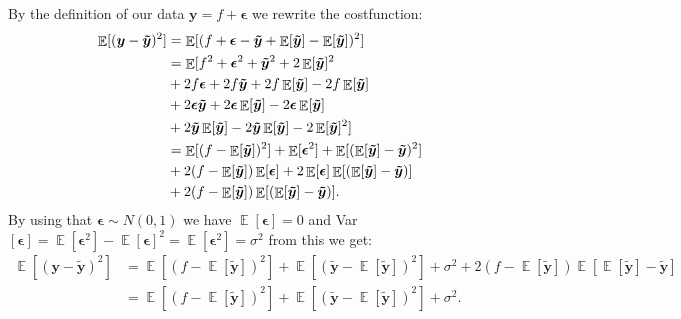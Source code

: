 \documentclass[11pt]{article}
\DeclareMathOperator*{\E}{\mathbb{E}}
\begin{document}
By the definition of our data $\boldsymbol{y} = f +\boldsymbol{\epsilon}$ we rewrite the costfunction:
\begin{align*}
    \E[(\boldsymbol{y}- \boldsymbol{\tilde{y}})^2] & = \E[(f + \boldsymbol{\epsilon} - \boldsymbol{\tilde{y}} + \E[\boldsymbol{\tilde{y}}]- \E[\boldsymbol{\tilde{y}}])^2]                                  \\                                             &= \E[f^2 + \boldsymbol{\epsilon}^2 + \boldsymbol{\tilde{y}}^2 + 2\E[\boldsymbol{\tilde{y}}]^2 \\
                                                   & + 2f\boldsymbol{\epsilon} + 2f\boldsymbol{\tilde{y}} + 2f\E[\boldsymbol{\tilde{y}}] - 2f\E[\boldsymbol{\tilde{y}}]                                     \\
                                                   & + 2\boldsymbol{\epsilon}\boldsymbol{\tilde{y}} + 2\boldsymbol{\epsilon} \E[\boldsymbol{\tilde{y}}] - 2\boldsymbol{\epsilon} \E[\boldsymbol{\tilde{y}}] \\
                                                   & + 2\boldsymbol{\tilde{y}}\E[\boldsymbol{\tilde{y}}] - 2\boldsymbol{\tilde{y}}\E[\boldsymbol{\tilde{y}}] -2\E[\boldsymbol{\tilde{y}}]^2]                \\
                                                   & = \E[(f-\E[\boldsymbol{\Tilde{y}}])^2] + \E[\boldsymbol{\epsilon}^2] + \E[( \E[\boldsymbol{\Tilde{y}}] - \boldsymbol{\Tilde{y}} )^2]                   \\
                                                   & + 2(f-\E[\boldsymbol{\tilde{y}}])\E[\boldsymbol{\epsilon}]+2\E[\boldsymbol{\epsilon}]\E[(\E[\boldsymbol{\tilde{y}}]-\boldsymbol{\tilde{y}} )]          \\
                                                   & + 2(f-\E[\boldsymbol{\tilde{y}}])\E[( \E[\boldsymbol{\tilde{y}}] - \boldsymbol{\tilde{y}} )].
\end{align*}
By using that $\boldsymbol{\epsilon} \sim N(0,1)$ we have $\E[\boldsymbol{\epsilon}] = 0$ and Var$[\boldsymbol{\epsilon}] = \E[\boldsymbol{\epsilon}^2]- \E[\boldsymbol{\epsilon}]^2 = \E[\boldsymbol{\epsilon}^2]=\sigma^2$ from this we get:
\begin{align*}
    \E[(\boldsymbol{y}- \boldsymbol{\boldsymbol{\tilde{y}}})^2] & =\E[(f -\E[\boldsymbol{\tilde{y}}])^2] +\E[( \boldsymbol{\tilde{y}} -\E[\boldsymbol{\tilde{y}}])^2]  + \sigma^2+ 2(f-\E[\boldsymbol{\tilde{y}}])\E[\E[\boldsymbol{\tilde{y}}] -\boldsymbol{\tilde{y}}] \\
                                                                & =\E[(f -\E[\boldsymbol{\tilde{y}}])^2]  + \E[( \boldsymbol{\tilde{y}} -\E[\boldsymbol{\tilde{y}}])^2]+\sigma^2.
\end{align*}
\end{document}
